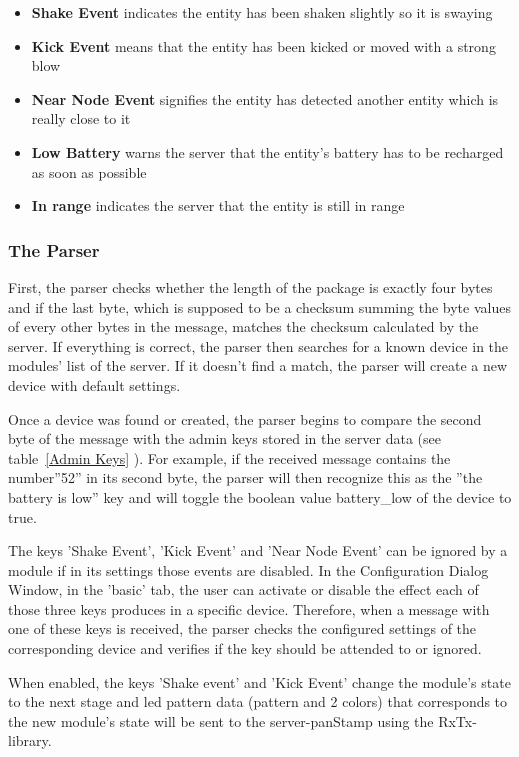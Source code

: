 \begin{itemize}
\item \textbf {Shake Event} indicates the entity has been shaken slightly so it is swaying
\item \textbf {Kick Event} means that the entity has been kicked or moved with a strong blow
\item \textbf {Near Node Event} signifies the entity has detected another entity which is really close to it
\item \textbf {Low Battery} warns the server that the entity's battery has to be recharged as soon as possible
\item \textbf {In range} indicates the server that the entity is still in range
\end{itemize}




\subsubsection{The Parser}
 
First, the parser checks whether the length of the package is exactly four bytes
and if the last byte, which is supposed to be a checksum summing the byte values
of every other bytes in the message, matches the checksum calculated by the
server. If everything is correct, the parser then searches for a known device in
the modules' list of the server. If it doesn't find a match, the parser will create a new device
with default settings. 

Once a device was found or created, the parser begins to compare the second byte of the message with the admin keys stored in the server data (see table~\ref{Admin Keys} ). For example, if the received message contains the number''52'' in its second byte, the parser will then recognize this as the ''the battery is low'' key and will toggle the boolean value battery\_low of the device to true. 

The keys 'Shake Event', 'Kick Event' and 'Near Node Event' can be ignored by a module if in its settings those events are disabled. In the Configuration Dialog Window, in the 'basic' tab, the user can activate or disable the effect each of those three keys produces in a specific device. 
Therefore, when a message with one of these keys is received, the parser checks the configured settings of the corresponding device and verifies if the key should be attended to or ignored. 
 
When enabled, the keys 'Shake event' and 'Kick Event' change the module's state to the next stage and led pattern data (pattern and 2 colors) that corresponds to the new module's state will be sent to the server-panStamp using the RxTx-library. 

